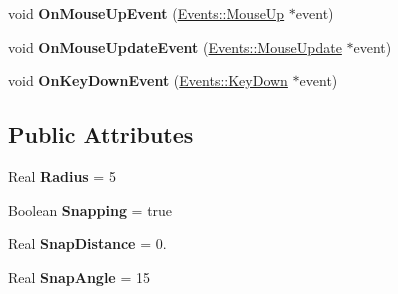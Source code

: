 \begin{DoxyCompactItemize}
\item 
\hypertarget{classDCEngine_1_1Components_1_1TransformTool_ae8f5503749afd8a57d5cee840cdeb95a}{void {\bfseries On\-Mouse\-Up\-Event} (\hyperlink{classDCEngine_1_1Events_1_1MouseUp}{Events\-::\-Mouse\-Up} $\ast$event)}\label{classDCEngine_1_1Components_1_1TransformTool_ae8f5503749afd8a57d5cee840cdeb95a}

\item 
\hypertarget{classDCEngine_1_1Components_1_1TransformTool_aaeb30ce1ba8f55a92ac2e867a11c7fa8}{void {\bfseries On\-Mouse\-Update\-Event} (\hyperlink{classDCEngine_1_1Events_1_1MouseUpdate}{Events\-::\-Mouse\-Update} $\ast$event)}\label{classDCEngine_1_1Components_1_1TransformTool_aaeb30ce1ba8f55a92ac2e867a11c7fa8}

\item 
\hypertarget{classDCEngine_1_1Components_1_1TransformTool_a539605fdc7780d0431c7f5abc3bb6edc}{void {\bfseries On\-Key\-Down\-Event} (\hyperlink{classDCEngine_1_1Events_1_1KeyDown}{Events\-::\-Key\-Down} $\ast$event)}\label{classDCEngine_1_1Components_1_1TransformTool_a539605fdc7780d0431c7f5abc3bb6edc}

\end{DoxyCompactItemize}
\subsection*{Public Attributes}
\begin{DoxyCompactItemize}
\item 
\hypertarget{classDCEngine_1_1Components_1_1TransformTool_aa7927859eea296cae97aa6a2540ba1fe}{Real {\bfseries Radius} = 5}\label{classDCEngine_1_1Components_1_1TransformTool_aa7927859eea296cae97aa6a2540ba1fe}

\item 
\hypertarget{classDCEngine_1_1Components_1_1TransformTool_a7cb7d7e18a576019bfaebbddcbf03812}{Boolean {\bfseries Snapping} = true}\label{classDCEngine_1_1Components_1_1TransformTool_a7cb7d7e18a576019bfaebbddcbf03812}

\item 
\hypertarget{classDCEngine_1_1Components_1_1TransformTool_aeb28fb61f6e87239750d040461e1d1fc}{Real {\bfseries Snap\-Distance} = 0.}\label{classDCEngine_1_1Components_1_1TransformTool_aeb28fb61f6e87239750d040461e1d1fc}

\item 
\hypertarget{classDCEngine_1_1Components_1_1TransformTool_a6048d2a0de3b0c3694d4b4d85508f47c}{Real {\bfseries Snap\-Angle} = 15}\label{classDCEngine_1_1Components_1_1TransformTool_a6048d2a0de3b0c3694d4b4d85508f47c}

\end{DoxyCompactItemize}
